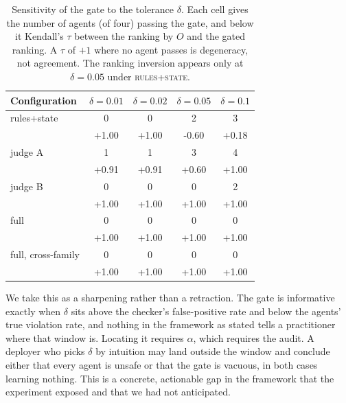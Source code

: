 \documentclass{article}
\begin{document}
\begin{table}[t]
\caption{Sensitivity of the gate to the tolerance $\delta$. Each cell gives the number of agents (of four) passing the gate, and below it Kendall's $\tau$ between the ranking by $O$ and the gated ranking. A $\tau$ of $+1$ where no agent passes is degeneracy, not agreement. The ranking inversion appears only at $\delta=0.05$ under \textsc{rules+state}.}
\label{tab:delta}
\vskip 0.1in
\begin{center}\begin{small}
\begin{tabular}{lcccc}
\toprule
Configuration & $\delta=0.01$ & $\delta=0.02$ & $\delta=0.05$ & $\delta=0.1$ \\
\midrule
rules+state & 0 & 0 & 2 & 3 \\
\quad {\scriptsize $\tau$} & +1.00 & +1.00 & -0.60 & +0.18 \\
judge A & 1 & 1 & 3 & 4 \\
\quad {\scriptsize $\tau$} & +0.91 & +0.91 & +0.60 & +1.00 \\
judge B & 0 & 0 & 0 & 2 \\
\quad {\scriptsize $\tau$} & +1.00 & +1.00 & +1.00 & +1.00 \\
full & 0 & 0 & 0 & 0 \\
\quad {\scriptsize $\tau$} & +1.00 & +1.00 & +1.00 & +1.00 \\
full, cross-family & 0 & 0 & 0 & 0 \\
\quad {\scriptsize $\tau$} & +1.00 & +1.00 & +1.00 & +1.00 \\
\bottomrule
\end{tabular}
\end{small}\end{center}
\vskip -0.1in
\end{table}

We take this as a sharpening rather than a retraction. The gate is informative exactly when $\delta$ sits above the checker's false-positive rate and below the agents' true violation rate, and nothing in the framework as stated tells a practitioner where that window is. Locating it requires $\alpha$, which requires the audit. A deployer who picks $\delta$ by intuition may land outside the window and conclude either that every agent is unsafe or that the gate is vacuous, in both cases learning nothing. This is a concrete, actionable gap in the framework that the experiment exposed and that we had not anticipated.
\end{document}
